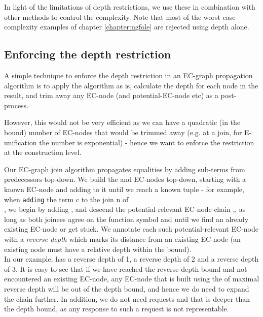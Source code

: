 In light of the limitations of depth restrictions, we use these in combination with other methods to control the complexity. Note that most of the worst case complexity examples of chapter \ref{chapter:ugfole} are rejected using depth alone.


\subsection{Enforcing the depth restriction}
A simple technique to enforce the depth restriction in an EC-graph propagation algorithm is to apply the algorithm as is, calculate the depth for each node in the result, and trim away any EC-node (and potential-EC-node etc) as a post-process.

However, this would not be very efficient as we can have a quadratic (in the bound) number of EC-nodes that would be trimmed away (e.g. at a join, for E-unification the number is exponential) - hence we want to enforce the restriction at the construction level.

Our EC-graph join algorithm propagates equalities by adding sub-terms from predecessors top-down.
We build the \GFAs{} and EC-nodes top-down, starting with a known EC-node and adding \GFAs{} to it until we reach a known tuple - for example, when \lstinline|adding| the term c to the join n of \\
, 
we begin by adding , and descend the potential-relevant EC-node chain ,, as long as both joinees agree on the function symbol and until we find an already existing EC-node or get stuck. 
We annotate each such potential-relevant EC-node with a \emph{reverse depth} which marks its distance from an existing EC-node (an existing node must have a relative depth within the bound).\\
In our example,  has a reverse depth of 1,  a reverse depth of 2 and  a reverse depth of 3. 
It is easy to see that if we have reached the reverse-depth bound and not encountered an existing EC-node, any EC-node that is built using the \GT{} of maximal reverse depth will be out of the depth bound, and hence we do need to expand the chain further.
In addition, we do not need requests and \RGFAs{} that is deeper than the depth bound, as any response to such a request is not representable.

